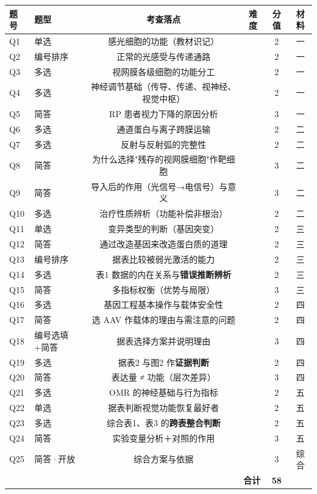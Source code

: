 \documentclass[UTF8,a4paper,11pt]{ctexart}
\newcommand{\dF}{\ding{72}}   %
\newcommand{\dE}{\ding{73}}   %
\begin{document}
\begin{table}[H]
\centering\small
\begin{tabular}{@{}llcccc@{}}
\toprule
\textbf{题号} & \textbf{题型} & \textbf{考查落点} & \textbf{难度} & \textbf{分值} & \textbf{材料} \\
\midrule
Q1 & 单选 & 感光细胞的功能（教材识记） & \dF\dE\dE\dE\dE & 2 & 一 \\
Q2 & 编号排序 & 正常的光感受与传递通路 & \dF\dF\dE\dE\dE & 2 & 一 \\
Q3 & 多选 & 视网膜各级细胞的功能分工 & \dF\dF\dE\dE\dE & 2 & 一 \\
Q4 & 多选 & 神经调节基础（传导、传递、视神经、视觉中枢） & \dF\dF\dF\dF\dE & 2 & 一 \\
Q5 & 简答 & RP 患者视力下降的原因分析 & \dF\dF\dF\dE\dE & 3 & 一 \\
Q6 & 多选 & 通道蛋白与离子跨膜运输 & \dF\dF\dF\dE\dE & 2 & 二 \\
Q7 & 多选 & 反射与反射弧的完整性 & \dF\dF\dF\dE\dE & 2 & 二 \\
Q8 & 简答 & 为什么选择"残存的视网膜细胞"作靶细胞 & \dF\dF\dF\dE\dE & 3 & 二 \\
Q9 & 简答 & 导入后的作用（光信号→电信号）与意义 & \dF\dF\dF\dE\dE & 3 & 二 \\
Q10 & 多选 & 治疗性质辨析（功能补偿非根治） & \dF\dF\dF\dE\dE & 2 & 二 \\
Q11 & 单选 & 变异类型的判断（基因突变） & \dF\dE\dE\dE\dE & 2 & 三 \\
Q12 & 简答 & 通过改造基因来改造蛋白质的道理 & \dF\dF\dF\dE\dE & 2 & 三 \\
Q13 & 编号排序 & 据表比较被弱光激活的能力 & \dF\dF\dE\dE\dE & 2 & 三 \\
Q14 & 多选 & 表1 数据的内在关系与\textbf{错误推断辨析} & \dF\dF\dF\dF\dE & 2 & 三 \\
Q15 & 简答 & 多指标权衡（优势与局限） & \dF\dF\dF\dF\dE & 3 & 三 \\
Q16 & 多选 & 基因工程基本操作与载体安全性 & \dF\dF\dF\dE\dE & 2 & 四 \\
Q17 & 简答 & 选 AAV 作载体的理由与需注意的问题 & \dF\dF\dE\dE\dE & 2 & 四 \\
Q18 & 编号选填+简答 & 据表选择方案并说明理由 & \dF\dF\dE\dE\dE & 3 & 四 \\
Q19 & 多选 & 据表2 与图2 作\textbf{证据判断} & \dF\dF\dF\dF\dE & 2 & 四 \\
Q20 & 简答 & 表达量 ≠ 功能（层次差异） & \dF\dF\dF\dF\dE & 3 & 四 \\
Q21 & 多选 & OMR 的神经基础与行为指标 & \dF\dF\dF\dE\dE & 2 & 五 \\
Q22 & 单选 & 据表判断视觉功能恢复最好者 & \dF\dF\dF\dE\dE & 2 & 五 \\
Q23 & 多选 & 综合表1、表3 的\textbf{跨表整合判断} & \dF\dF\dF\dF\dF & 2 & 五 \\
Q24 & 简答 & 实验变量分析＋对照的作用 & \dF\dF\dF\dF\dE & 3 & 五 \\
Q25 & 简答·开放 & 综合方案与依据 & \dF\dF\dF\dF\dF & 3 & 综合 \\
\midrule
\multicolumn{4}{r}{\textbf{合计}} & \textbf{58} & \\
\bottomrule
\end{tabular}
\end{table}
\end{document}
